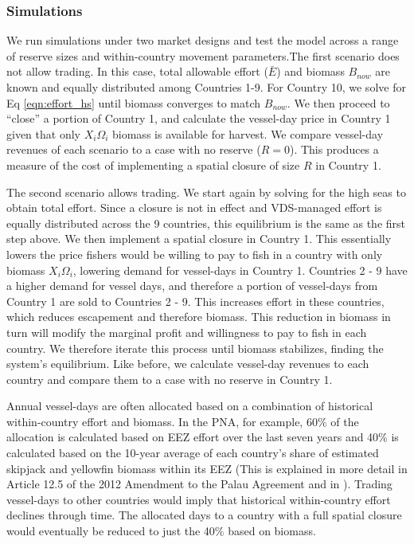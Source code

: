 \documentclass[12pt]{article}
\begin{document}
\subsubsection{Simulations}

We run simulations under two market designs and test the model across a range of reserve sizes and within-country movement parameters.The first scenario does not allow trading. In this case, total allowable effort ($\bar{E}$) and biomass $B_{now}$ are known and equally distributed among Countries 1-9. For Country 10, we solve for Eq \ref{eqn:effort_hs} until biomass converges to match $B_{now}$. We then proceed to ``close'' a portion of Country 1, and calculate the vessel-day price in Country 1 given that only $X_i\Omega_i$ biomass is available for harvest. We compare vessel-day revenues of each scenario to a case with no reserve ($R = 0$). This produces a measure of the cost of implementing a spatial closure of size $R$ in Country 1.

The second scenario allows trading. We start again by solving for the high seas to obtain total effort. Since a closure is not in effect and VDS-managed effort is equally distributed across the 9 countries, this equilibrium is the same as the first step above. We then implement a spatial closure in Country 1. This essentially lowers the price fishers would be willing to pay to fish in a country with only biomass $X_i\Omega_i$, lowering demand for vessel-days in Country 1. Countries 2 - 9 have a higher demand for vessel days, and therefore a portion of vessel-days from Country 1 are sold to Countries 2 - 9. This increases effort in these countries, which reduces escapement and therefore biomass. This reduction in biomass in turn will modify the marginal profit and willingness to pay to fish in each country. We therefore iterate this process until biomass stabilizes, finding the system's equilibrium. Like before, we calculate vessel-day revenues to each country and compare them to a case with no reserve in Country 1.

Annual vessel-days are often allocated based on a combination of historical within-country effort and biomass. In the PNA, for example, 60\% of the allocation is calculated based on EEZ effort over the last seven years and 40\% is calculated based on the 10-year average of each country’s share of estimated skipjack and yellowfin biomass within its EEZ (This is explained in more detail in Article 12.5 of the 2012 Amendment to the Palau Agreement and in \cite{Hagrannsoknir2014}). Trading vessel-days to other countries would imply that historical within-country effort declines through time. The allocated days to a country with a full spatial closure would eventually be reduced to just the 40\% based on biomass.
\end{document}
